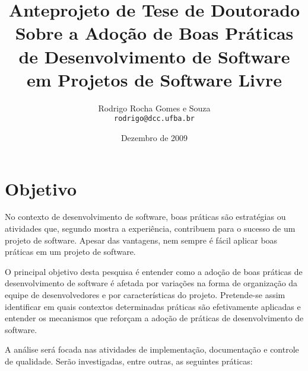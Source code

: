 \documentclass{article}
\title{
{\small Anteprojeto de Tese de Doutorado}
\\
Sobre a Adoção de Boas Práticas 
de Desenvolvimento de Software 
em Projetos de Software Livre
%
}
\author{Rodrigo Rocha Gomes e Souza\\
\texttt{rodrigo@dcc.ufba.br}
}
\date{Dezembro de 2009}
\begin{document}
\sloppy
\maketitle





\section{Objetivo}

%

No contexto de desenvolvimento de software, boas práticas são estratégias ou
atividades que, segundo mostra a experiência, contribuem para o sucesso de um
projeto de software. Apesar das vantagens, nem sempre é fácil aplicar boas
práticas em um projeto de software.

O principal objetivo desta pesquisa é entender como a adoção de boas práticas de
desenvolvimento de software é afetada por variações na forma de organização da
equipe de desenvolvedores e por características do projeto. Pretende-se assim
identificar em quais contextos determinadas práticas são efetivamente aplicadas
e entender os mecanismos que reforçam a adoção de práticas de desenvolvimento de
software.

A análise será focada nas atividades de implementação, documentação e controle
de qualidade. Serão investigadas, entre outras, as seguintes práticas:
\end{document}
